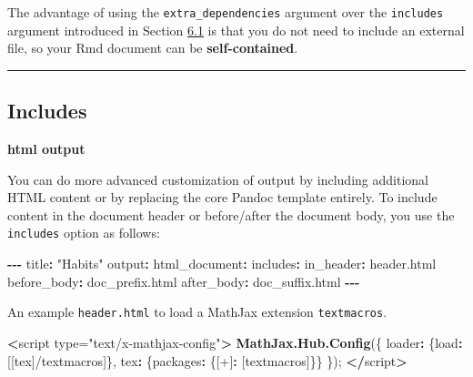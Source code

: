 \documentclass[
]{book}
\newenvironment{Shaded}{\begin{snugshade}}{\end{snugshade}}
\newcommand{\ErrorTok}[1]{\textcolor[rgb]{0.64,0.00,0.00}{\textbf{#1}}}
\newcommand{\FunctionTok}[1]{\textcolor[rgb]{0.13,0.29,0.53}{\textbf{#1}}}
\newcommand{\NormalTok}[1]{#1}
\newcommand{\OtherTok}[1]{\textcolor[rgb]{0.56,0.35,0.01}{#1}}
\newcommand{\SpecialCharTok}[1]{\textcolor[rgb]{0.81,0.36,0.00}{\textbf{#1}}}
\newcommand{\StringTok}[1]{\textcolor[rgb]{0.31,0.60,0.02}{#1}}
\theoremstyle{definition}
\theoremstyle{definition}
\theoremstyle{definition}
\theoremstyle{definition}
\theoremstyle{remark}
\begin{document}
The advantage of using the \texttt{extra\_dependencies} argument over the \texttt{includes} argument introduced in Section \href{https://bookdown.org/yihui/rmarkdown-cookbook/latex-preamble.html\#latex-preamble}{6.1} is that you do not need to include an external file, so your Rmd document can be \textbf{self-contained}.

\begin{center}\rule{0.5\linewidth}{0.5pt}\end{center}

\subsection*{Includes}\label{includes}

\textbf{html output}

You can do more advanced customization of output by including additional HTML content or by replacing the core Pandoc template entirely. To include content in the document header or before/after the document body, you use the \texttt{includes} option as follows:

\begin{Shaded}
\begin{Highlighting}[]
\SpecialCharTok{{-}{-}{-}}
\NormalTok{title}\SpecialCharTok{:} \StringTok{"Habits"}
\NormalTok{output}\SpecialCharTok{:}
\NormalTok{  html\_document}\SpecialCharTok{:}
\NormalTok{    includes}\SpecialCharTok{:}
\NormalTok{      in\_header}\SpecialCharTok{:}\NormalTok{ header.html}
\NormalTok{      before\_body}\SpecialCharTok{:}\NormalTok{ doc\_prefix.html}
\NormalTok{      after\_body}\SpecialCharTok{:}\NormalTok{ doc\_suffix.html}
\SpecialCharTok{{-}{-}{-}}
\end{Highlighting}
\end{Shaded}

An example \texttt{header.html} to load a MathJax extension \texttt{textmacros}.

\begin{Shaded}
\begin{Highlighting}[]
\SpecialCharTok{\textless{}}\NormalTok{script type}\OtherTok{=}\StringTok{"text/x{-}mathjax{-}config"}\SpecialCharTok{\textgreater{}}
  \FunctionTok{MathJax.Hub.Config}\NormalTok{(\{ }
\NormalTok{    loader}\SpecialCharTok{:}\NormalTok{ \{load}\SpecialCharTok{:}\NormalTok{ [}\StringTok{\textquotesingle{}[tex]/textmacros\textquotesingle{}}\NormalTok{]\},}
\NormalTok{    tex}\SpecialCharTok{:}\NormalTok{ \{packages}\SpecialCharTok{:}\NormalTok{ \{}\StringTok{\textquotesingle{}[+]\textquotesingle{}}\SpecialCharTok{:}\NormalTok{ [}\StringTok{\textquotesingle{}textmacros\textquotesingle{}}\NormalTok{]\}\}}
\NormalTok{  \});}
\SpecialCharTok{\textless{}}\ErrorTok{/}\NormalTok{script}\SpecialCharTok{\textgreater{}}
\end{Highlighting}
\end{Shaded}
\end{document}
